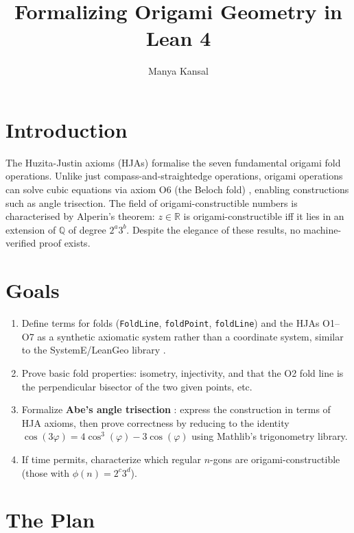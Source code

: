 \documentclass{article}
\title{\vspace{-2em}Formalizing Origami Geometry in Lean 4}
\author{Manya Kansal}
\date{}
\begin{document}
\maketitle
\vspace{-1em}

\section*{Introduction}

The Huzita-Justin axioms (HJAs) formalise the seven fundamental origami
fold operations. Unlike just compass-and-straightedge operations, origami operations can solve cubic
equations via axiom O6 (the Beloch fold) \cite{alperin2000}, enabling constructions such as
angle trisection. The field of origami-constructible numbers is
characterised by Alperin's theorem: $z \in \mathbb{R}$ is
origami-constructible iff it lies in an extension of $\mathbb{Q}$ of
degree $2^a3^b$. Despite the elegance of these results, no
machine-verified proof exists.

\section*{Goals}

\begin{enumerate}
    \item Define terms for folds (\texttt{FoldLine}, \texttt{foldPoint},
    \texttt{foldLine}) and the HJAs O1--O7 as a synthetic axiomatic
    system rather than a coordinate system, similar to the SystemE/LeanGeo library \cite{avigad2009}.

    \item Prove basic fold properties: isometry, injectivity, and that
    the O2 fold line is the perpendicular bisector of the two given points, etc.

    \item Formalize \textbf{Abe's angle trisection} \cite{fuchs2011}:
    express the construction in terms of HJA axioms, then prove
    correctness by reducing to the identity
    $\cos(3\varphi) = 4\cos^3(\varphi) - 3\cos(\varphi)$
    using Mathlib's trigonometry library.

    \item If time permits, characterize which regular $n$-gons are
    origami-constructible (those with $\phi(n) = 2^c3^d$).
\end{enumerate}

\section*{The Plan}
\end{document}
